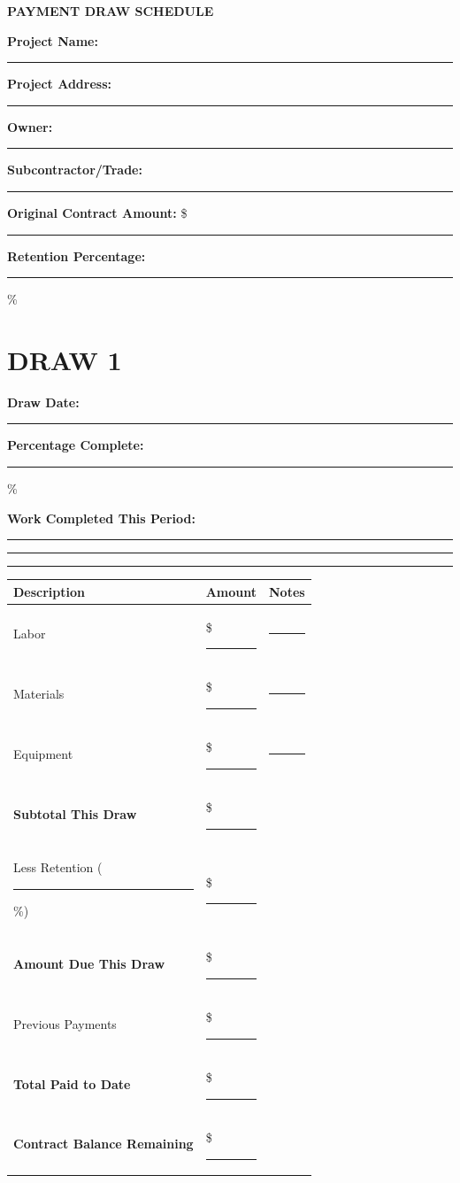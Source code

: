 \documentclass[11pt,letterpaper]{article}
\begin{document}
\begin{center}
\textbf{\Large PAYMENT DRAW SCHEDULE}
\end{center}

\vspace{12pt}

\textbf{Project Name:} \rule{8cm}{0.4pt}

\textbf{Project Address:} \rule{8cm}{0.4pt}

\textbf{Owner:} \rule{9cm}{0.4pt}

\textbf{Subcontractor/Trade:} \rule{7cm}{0.4pt}

\textbf{Original Contract Amount:} \$ \rule{5cm}{0.4pt}

\textbf{Retention Percentage:} \rule{2cm}{0.4pt} \%

\vspace{12pt}

\section*{DRAW 1}

\textbf{Draw Date:} \rule{4cm}{0.4pt} \hspace{0.5in} \textbf{Percentage Complete:} \rule{2cm}{0.4pt} \%

\textbf{Work Completed This Period:}

\rule{14cm}{0.4pt}

\rule{14cm}{0.4pt}

\rule{14cm}{0.4pt}

\begin{tabular}{|p{3in}|p{1.5in}|p{1.5in}|}
\hline
\textbf{Description} & \textbf{Amount} & \textbf{Notes} \\
\hline
Labor & \$ \rule{1in}{0.4pt} & \rule{1in}{0.4pt} \\
\hline
Materials & \$ \rule{1in}{0.4pt} & \rule{1in}{0.4pt} \\
\hline
Equipment & \$ \rule{1in}{0.4pt} & \rule{1in}{0.4pt} \\
\hline
\textbf{Subtotal This Draw} & \$ \rule{1in}{0.4pt} & \\
\hline
Less Retention (\rule{1cm}{0.4pt}\%) & \$ \rule{1in}{0.4pt} & \\
\hline
\textbf{Amount Due This Draw} & \$ \rule{1in}{0.4pt} & \\
\hline
Previous Payments & \$ \rule{1in}{0.4pt} & \\
\hline
\textbf{Total Paid to Date} & \$ \rule{1in}{0.4pt} & \\
\hline
\textbf{Contract Balance Remaining} & \$ \rule{1in}{0.4pt} & \\
\hline
\end{tabular}
\end{document}
